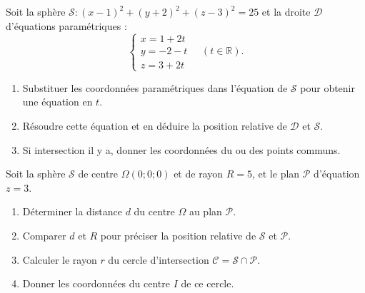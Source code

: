 \documentclass[11pt]{article}
\begin{document}
\begin{exercice}
Soit la sphère $\mathcal{S} : (x-1)^2 + (y+2)^2 + (z-3)^2 = 25$ et la droite $\mathcal{D}$ d'équations paramétriques :
\[ \begin{cases} x = 1 + 2t \\ y = -2 - t \\ z = 3 + 2t \end{cases} \quad (t \in \mathbb{R}). \]
\begin{enumerate}
    \item Substituer les coordonnées paramétriques dans l'équation de $\mathcal{S}$ pour obtenir une équation en $t$.
    \item Résoudre cette équation et en déduire la position relative de $\mathcal{D}$ et $\mathcal{S}$.
    \item Si intersection il y a, donner les coordonnées du ou des points communs.
\end{enumerate}
\end{exercice}

\begin{exercice}
Soit la sphère $\mathcal{S}$ de centre $\Omega(0; 0; 0)$ et de rayon $R = 5$, et le plan $\mathcal{P}$ d'équation $z = 3$.
\begin{enumerate}
    \item Déterminer la distance $d$ du centre $\Omega$ au plan $\mathcal{P}$.
    \item Comparer $d$ et $R$ pour préciser la position relative de $\mathcal{S}$ et $\mathcal{P}$.
    \item Calculer le rayon $r$ du cercle d'intersection $\mathcal{C} = \mathcal{S} \cap \mathcal{P}$.
    \item Donner les coordonnées du centre $I$ de ce cercle.
\end{enumerate}
\end{exercice}
\end{document}

